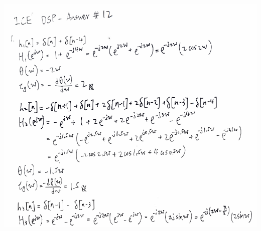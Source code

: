 \documentclass[a4paper]{article}
\begin{document}
	
	\begin{center}
		\includegraphics[width=1\linewidth]{screenshot116}
	\end{center}
	
\end{document}
